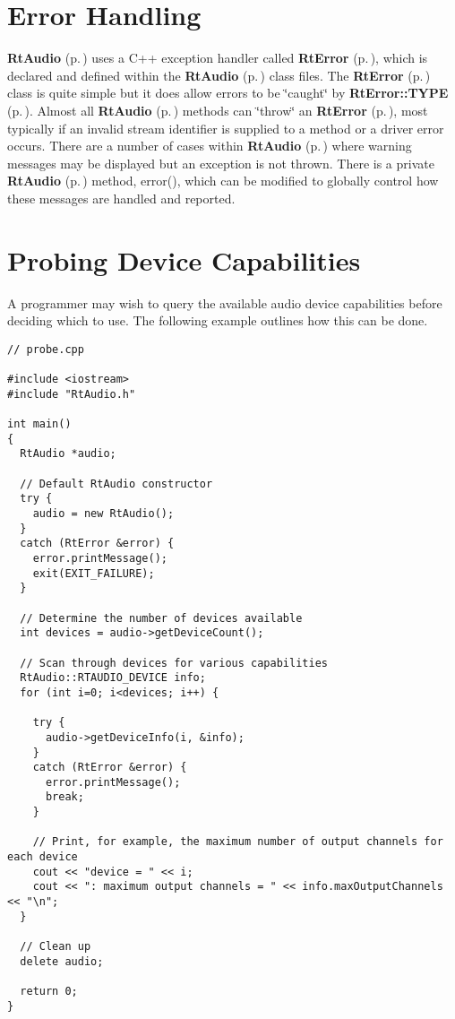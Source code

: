 \section{Error Handling}\label{error}


{\bf Rt\-Audio} {\rm (p.\,\pageref{classRtAudio})} uses a C++ exception handler called {\bf Rt\-Error} {\rm (p.\,\pageref{classRtError})}, which is declared and defined within the {\bf Rt\-Audio} {\rm (p.\,\pageref{classRtAudio})} class files. The {\bf Rt\-Error} {\rm (p.\,\pageref{classRtError})} class is quite simple but it does allow errors to be \char`\"{}caught\char`\"{} by {\bf Rt\-Error::TYPE} {\rm (p.\,\pageref{classRtError_s11})}. Almost all {\bf Rt\-Audio} {\rm (p.\,\pageref{classRtAudio})} methods can \char`\"{}throw\char`\"{} an {\bf Rt\-Error} {\rm (p.\,\pageref{classRtError})}, most typically if an invalid stream identifier is supplied to a method or a driver error occurs. There are a number of cases within {\bf Rt\-Audio} {\rm (p.\,\pageref{classRtAudio})} where warning messages may be displayed but an exception is not thrown. There is a private {\bf Rt\-Audio} {\rm (p.\,\pageref{classRtAudio})} method, error(), which can be modified to globally control how these messages are handled and reported.

\section{Probing Device Capabilities}\label{probing}


A programmer may wish to query the available audio device capabilities before deciding which to use. The following example outlines how this can be done.

\footnotesize\begin{verbatim}// probe.cpp

#include <iostream>
#include "RtAudio.h"

int main()
{
  RtAudio *audio;

  // Default RtAudio constructor
  try {
    audio = new RtAudio();
  }
  catch (RtError &error) {
    error.printMessage();
    exit(EXIT_FAILURE);
  }

  // Determine the number of devices available
  int devices = audio->getDeviceCount();

  // Scan through devices for various capabilities
  RtAudio::RTAUDIO_DEVICE info;
  for (int i=0; i<devices; i++) {

    try {
      audio->getDeviceInfo(i, &info);
    }
    catch (RtError &error) {
      error.printMessage();
      break;
    }

    // Print, for example, the maximum number of output channels for each device
    cout << "device = " << i;
    cout << ": maximum output channels = " << info.maxOutputChannels << "\n";
  }

  // Clean up
  delete audio;

  return 0;
}\end{verbatim}\normalsize 


